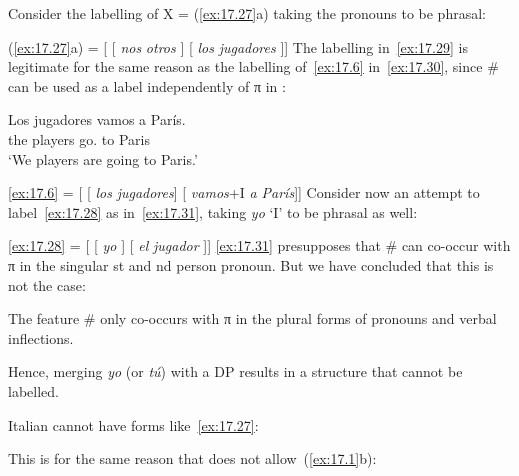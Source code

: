 \documentclass[output=paper]{langsci/langscibook}
\begin{document}
\label{ex:17.28}
\z
Consider the labelling of X = (\ref{ex:17.27}a) taking the pronouns to be
phrasal:

\ea\label{ex:17.29}
    (\ref{ex:17.27}a) = [ [ \emph{nos}\tss{\#} \emph{otros} ] [ \emph{los}\tss{\#} \emph{jugadores} ]]
\z
The labelling in~\eqref{ex:17.29} is legitimate for the same reason as the
labelling of~\eqref{ex:17.6} in~\eqref{ex:17.30}, since \# can be used as a
label independently of π in :

\begin{exe}
\exi{\eqref{ex:17.6}}
    \gll    Los jugadores vamos a París.\\
            the players      go.\Fpl{} to Paris\\
    \glt    ‘We players are going to Paris.’
\end{exe}

\ea\label{ex:17.30}
    \eqref{ex:17.6} = [ [ \emph{los}\tss{\#} \emph{jugadores}] [ \emph{vamos}+I\tss{\#}  \emph{a París}]]
\z
Consider now an attempt to label~\eqref{ex:17.28} as
in~\eqref{ex:17.31}, taking \emph{yo} ‘I’ to be phrasal as well:

\ea\label{ex:17.31}
    \eqref{ex:17.28} = [ [ \emph{yo} ] [ \emph{el}\tss{\#} \emph{jugador} ]]
\z
\eqref{ex:17.31} presupposes that \# can co-occur with π in the singular
\First{}st and \Second{}nd person pronoun. But we have concluded that this is
not the case:

\begin{exe}
\exi{\eqref{ex:17.21}}
    The feature \# only co-occurs with π in the plural forms of pronouns
    and verbal inflections.
\end{exe}
Hence, merging \emph{yo} (or \emph{tú}) with a DP results in a structure that
cannot be labelled.

Italian cannot have forms like~\eqref{ex:17.27}:

\ea\label{ex:17.32}
    \z
\z
This is for the same reason that  does not allow~(\ref{ex:17.1}b):
\end{document}
